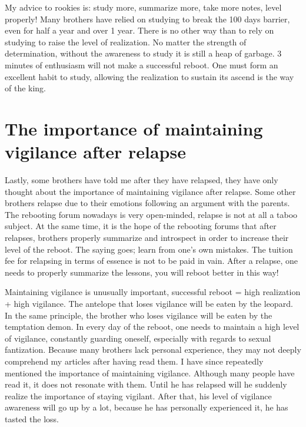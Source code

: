 \documentclass[
]{book}
\begin{document}
My advice to rookies is: study more, summarize more, take more notes, level properly! Many brothers have relied on studying to break the 100 days barrier, even for half a year and over 1 year. There is no other way than to rely on studying to raise the level of realization. No matter the strength of determination, without the awareness to study it is still a heap of garbage. 3 minutes of enthusiasm will not make a successful reboot. One must form an excellent habit to study, allowing the realization to sustain its ascend is the way of the king.

\hypertarget{the-importance-of-maintaining-vigilance-after-relapse}{%
\section{The importance of maintaining vigilance after relapse}\label{the-importance-of-maintaining-vigilance-after-relapse}}

Lastly, some brothers have told me after they have relapsed, they have only thought about the importance of maintaining vigilance after relapse. Some other brothers relapse due to their emotions following an argument with the parents. The rebooting forum nowadays is very open-minded, relapse is not at all a taboo subject. At the same time, it is the hope of the rebooting forums that after relapses, brothers properly summarize and introspect in order to increase their level of the reboot. The saying goes; learn from one's own mistakes. The tuition fee for relapsing in terms of essence is not to be paid in vain. After a relapse, one needs to properly summarize the lessons, you will reboot better in this way!

Maintaining vigilance is unusually important, successful reboot = high realization + high vigilance. The antelope that loses vigilance will be eaten by the leopard. In the same principle, the brother who loses vigilance will be eaten by the temptation demon. In every day of the reboot, one needs to maintain a high level of vigilance, constantly guarding oneself, especially with regards to sexual fantization. Because many brothers lack personal experience, they may not deeply comprehend my articles after having read them.
I have since repeatedly mentioned the importance of maintaining vigilance. Although many people have read it, it does not resonate with them. Until he has relapsed will he suddenly realize the importance of staying vigilant. After that, his level of vigilance awareness will go up by a lot, because he has personally experienced it, he has tasted the loss.
\end{document}
